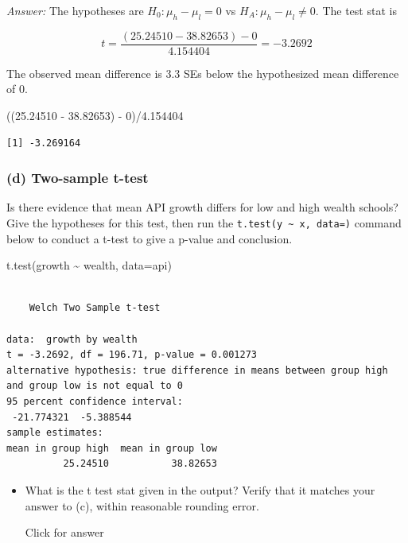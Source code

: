 \documentclass[
]{book}
\newenvironment{Shaded}{\begin{snugshade}}{\end{snugshade}}
\newcommand{\AttributeTok}[1]{\textcolor[rgb]{0.77,0.63,0.00}{#1}}
\newcommand{\DecValTok}[1]{\textcolor[rgb]{0.00,0.00,0.81}{#1}}
\newcommand{\FloatTok}[1]{\textcolor[rgb]{0.00,0.00,0.81}{#1}}
\newcommand{\FunctionTok}[1]{\textcolor[rgb]{0.00,0.00,0.00}{#1}}
\newcommand{\NormalTok}[1]{#1}
\newcommand{\SpecialCharTok}[1]{\textcolor[rgb]{0.00,0.00,0.00}{#1}}
\providecommand{\tightlist}{%
  \setlength{\itemsep}{0pt}\setlength{\parskip}{0pt}}
\begin{document}
\emph{Answer:} The hypotheses are \(H_0: \mu_h - \mu_l = 0\) vs \(H_A: \mu_h - \mu_l \neq 0\). The test stat is

\[t = \dfrac{(25.24510 - 38.82653) - 0}{4.154404} = -3.2692\]

The observed mean difference is 3.3 SEs below the hypothesized mean difference of 0.

\begin{Shaded}
\begin{Highlighting}[]
\NormalTok{((}\FloatTok{25.24510} \SpecialCharTok{{-}} \FloatTok{38.82653}\NormalTok{) }\SpecialCharTok{{-}} \DecValTok{0}\NormalTok{)}\SpecialCharTok{/}\FloatTok{4.154404} 
\end{Highlighting}
\end{Shaded}

\begin{verbatim}
[1] -3.269164
\end{verbatim}

\hypertarget{d-two-sample-t-test}{%
\subsubsection{(d) Two-sample t-test}\label{d-two-sample-t-test}}

Is there evidence that mean API growth differs for low and high wealth schools? Give the hypotheses for this test, then run the \texttt{t.test(y\ \textasciitilde{}\ x,\ data=)} command below to conduct a t-test to give a p-value and conclusion.

\begin{Shaded}
\begin{Highlighting}[]
\FunctionTok{t.test}\NormalTok{(growth }\SpecialCharTok{\textasciitilde{}}\NormalTok{ wealth, }\AttributeTok{data=}\NormalTok{api)}
\end{Highlighting}
\end{Shaded}

\begin{verbatim}

    Welch Two Sample t-test

data:  growth by wealth
t = -3.2692, df = 196.71, p-value = 0.001273
alternative hypothesis: true difference in means between group high and group low is not equal to 0
95 percent confidence interval:
 -21.774321  -5.388544
sample estimates:
mean in group high  mean in group low 
          25.24510           38.82653 
\end{verbatim}

\begin{itemize}
\tightlist
\item
  What is the t test stat given in the output? Verify that it matches your answer to (c), within reasonable rounding error.

  Click for answer
\end{itemize}
\end{document}

